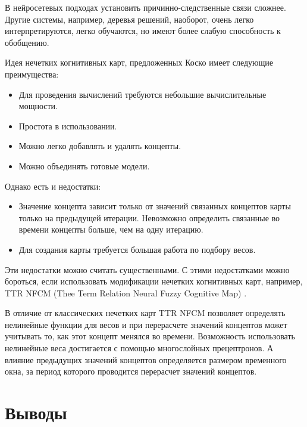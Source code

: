 В нейросетевых подходах установить причинно-следственные связи сложнее.
Другие системы, например, деревья решений, наоборот, очень легко интерпретируются, легко обучаются,
но имеют более слабую способность к обобщению.

Идея нечетких когнитивных карт, предложенных Коско \cite{kosko1986fuzzy} имеет следующие преимущества:

\begin{itemize}
	\item Для проведения вычислений требуются небольшие вычислительные мощности.
	\item Простота в использовании.
	\item Можно легко добавлять и удалять концепты.
	\item Можно объединять готовые модели.
\end{itemize}

Однако есть и недостатки:

\begin{itemize}
	\item Значение концепта зависит только от значений связанных концептов карты только на предыдущей итерации.
	Невозможно определить связанные во времени концепты больше, чем на одну итерацию.
	\item Для создания карты требуется большая работа по подбору весов.
\end{itemize}

Эти недостатки можно считать существенными.
С этими недостатками можно бороться, если использовать модификации нечетких когнитивных карт,
например, TTR NFCM (Thee Term Relation Neural Fuzzy Cognitive Map) \cite{threeTermNfcm}.

В отличие от классических нечетких карт TTR NFCM позволяет
определять нелинейные функции для весов и при перерасчете значений концептов может учитывать то, как
этот концепт менялся во времени. Возможность использовать нелинейные веса достигается с помощью многослойных прецептронов.
А влияние предыдущих значений концептов определяется размером временного окна, за период которого проводится перерасчет
значений концептов.


\section{Выводы}

